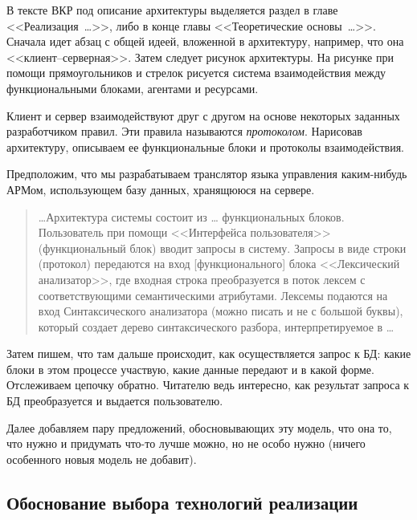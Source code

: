 \documentclass[a4paper,14pt,final]{extreport}
\begin{document}
В тексте ВКР под описание архитектуры выделяется раздел в главе <<Реализация~\ldots>>, либо в конце главы <<Теоретические основы~\ldots{}>>.  Сначала идет абзац с общей идеей, вложенной в архитектуру, например, что она <<клиент--серверная>>.  Затем следует рисунок архитектуры.  На рисунке при помощи прямоугольников и стрелок рисуется система взаимодействия между функциональными блоками, агентами и ресурсами.

Клиент и сервер взаимодействуют друг с другом на основе некоторых заданных разработчиком правил.  Эти правила называются \emph{протоколом}.  Нарисовав архитектуру, описываем ее функциональные блоки и протоколы взаимодействия.

Предположим, что мы разрабатываем транслятор языка управления каким-нибудь АРМом, использующем базу данных, хранящююся на сервере.
\begin{quote}
  \ldots{}Архитектура системы состоит из \ldots{} функциональных блоков.  Пользователь при помощи <<Интерфейса пользователя>> (функциональный блок) вводит запросы в систему.  Запросы в виде строки (протокол) передаются на вход [функционального] блока <<Лексический анализатор>>, где входная строка преобразуется в поток лексем с соответствующими семантическими атрибутами.  Лексемы подаются на вход Синтаксического анализатора (можно писать и не с большой буквы), который создает дерево синтаксического разбора, интерпретируемое в \ldots{}
\end{quote}
Затем пишем, что там дальше происходит, как осуществляется запрос к БД: какие блоки в этом процессе участвую, какие данные передают и в какой форме.  Отслеживаем цепочку обратно.  Читателю ведь интересно, как результат запроса к БД преобразуется и выдается пользователю.

Далее добавляем пару предложений, обосновывающих эту модель, что она то, что нужно и придумать что-то лучше можно, но не особо нужно (ничего особенного новыя модель не добавит).

\subsection{Обоснование выбора технологий реализации}
\label{sec:provtech}
\end{document}
